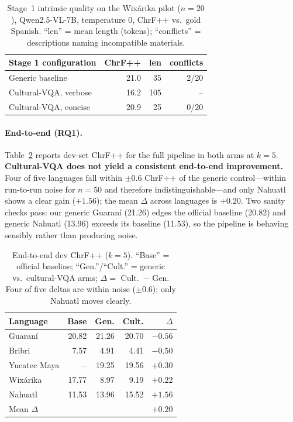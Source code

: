 \documentclass[11pt]{article}
\begin{document}
\begin{table}[t]
\centering
\small
\begin{tabular}{lrrr}
\toprule
\textbf{Stage 1 configuration} & \textbf{ChrF++} & \textbf{len} & \textbf{conflicts} \\
\midrule
Generic baseline          & 21.0 & 35  & 2/20 \\
Cultural-VQA, verbose     & 16.2 & 105 & --   \\
Cultural-VQA, concise     & 20.9 & 25  & 0/20 \\
\bottomrule
\end{tabular}
\caption{Stage~1 intrinsic quality on the Wixárika pilot ($n{=}20$),
Qwen2.5-VL-7B, temperature 0, ChrF++ vs.\ gold Spanish. ``len'' = mean length
(tokens); ``conflicts'' = descriptions naming incompatible materials.}
\label{tab:stage1}
\end{table}

\paragraph{End-to-end (RQ1).} Table~\ref{tab:rq1} reports dev-set ChrF++ for the
full pipeline in both arms at $k{=}5$. \textbf{Cultural-VQA does not yield a
consistent end-to-end improvement.} Four of five languages fall within
$\pm0.6$ ChrF++ of the generic control—within run-to-run noise for $n{=}50$ and
therefore indistinguishable—and only Nahuatl shows a clear gain ($+1.56$); the
mean $\Delta$ across languages is $+0.20$. Two sanity checks pass: our generic
Guaraní (21.26) edges the official baseline (20.82) and generic Nahuatl (13.96)
exceeds its baseline (11.53), so the pipeline is behaving sensibly rather than
producing noise.

\begin{table}[t]
\centering
\small
\begin{tabular}{lrrrr}
\toprule
\textbf{Language} & \textbf{Base} & \textbf{Gen.} & \textbf{Cult.} & \textbf{$\Delta$} \\
\midrule
Guaraní       & 20.82 & 21.26 & 20.70 & $-0.56$ \\
Bribri        & 7.57  & 4.91  & 4.41  & $-0.50$ \\
Yucatec Maya  & --    & 19.25 & 19.56 & $+0.30$ \\
Wixárika      & 17.77 & 8.97  & 9.19  & $+0.22$ \\
Nahuatl       & 11.53 & 13.96 & 15.52 & $+1.56$ \\
\midrule
Mean $\Delta$ &       &       &       & $+0.20$ \\
\bottomrule
\end{tabular}
\caption{End-to-end dev ChrF++ ($k{=}5$). ``Base'' = official baseline;
``Gen.''/``Cult.'' = generic vs.\ cultural-VQA arms; $\Delta = $ Cult.\ $-$ Gen.
Four of five deltas are within noise ($\pm0.6$); only Nahuatl moves clearly.}
\label{tab:rq1}
\end{table}
\end{document}
